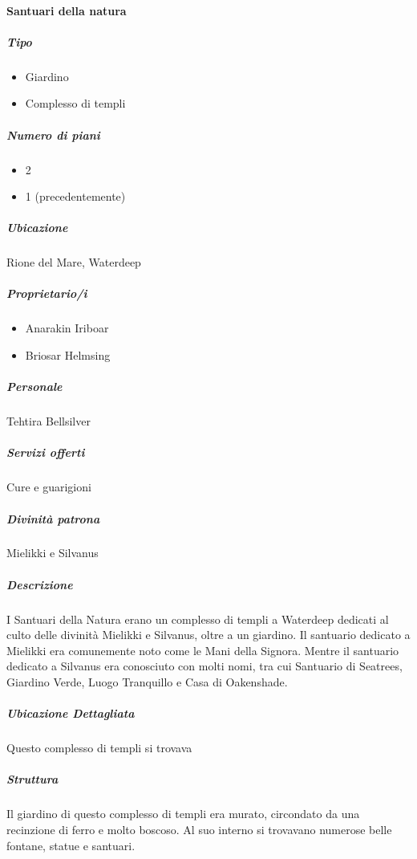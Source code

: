 \documentclass{article}
\begin{document}
              \paragraph{Santuari della natura}
              \subparagraph{Tipo}
              \begin{itemize}
                  \item Giardino
                  \item Complesso di templi
              \end{itemize}
              
              \subparagraph{Numero di piani}
              \begin{itemize}
                  \item 2
                  \item 1 (precedentemente)
              \end{itemize}
              
              \subparagraph{Ubicazione}
              Rione del Mare, Waterdeep
              
              \subparagraph{Proprietario/i}
              \begin{itemize}
                  \item Anarakin Iriboar
                  \item Briosar Helmsing
              \end{itemize}
              
              \subparagraph{Personale}
              Tehtira Bellsilver
              
              \subparagraph{Servizi offerti}
              Cure e guarigioni
              
              \subparagraph{Divinità patrona}
              Mielikki e Silvanus
              
              \subparagraph{Descrizione}
              I Santuari della Natura erano un complesso di templi a Waterdeep dedicati al culto delle divinità Mielikki e Silvanus, oltre a un giardino. Il santuario dedicato a Mielikki era comunemente noto come le Mani della Signora. Mentre il santuario dedicato a Silvanus era conosciuto con molti nomi, tra cui Santuario di Seatrees, Giardino Verde, Luogo Tranquillo e Casa di Oakenshade.
              
              \subparagraph{Ubicazione Dettagliata}
              Questo complesso di templi si trovava
              
              \subparagraph{Struttura}
                Il giardino di questo complesso di templi era murato, circondato da una recinzione di ferro e molto boscoso. Al suo interno si trovavano numerose belle fontane, statue e santuari.
\end{document}
